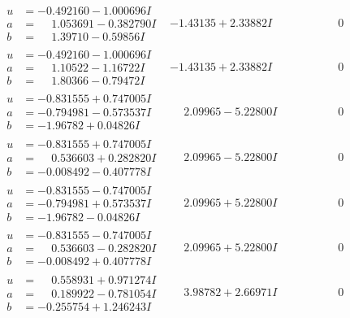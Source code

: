 \documentclass[1p]{elsarticle_modified}
\theoremstyle{definition}
\begin{document}
$$\begin{array}{c|c|c}
\begin{aligned}
u &= -0.492160 - 1.000696 I \\
a &= \phantom{-}1.053691 - 0.382790 I \\
b &= \phantom{-}1.39710 - 0.59856 I\end{aligned}
 & -1.43135 + 2.33882 I & \phantom{-0.000000 } 0 \\ \hline\begin{aligned}
u &= -0.492160 - 1.000696 I \\
a &= \phantom{-}1.10522 - 1.16722 I \\
b &= \phantom{-}1.80366 - 0.79472 I\end{aligned}
 & -1.43135 + 2.33882 I & \phantom{-0.000000 } 0 \\ \hline\begin{aligned}
u &= -0.831555 + 0.747005 I \\
a &= -0.794981 - 0.573537 I \\
b &= -1.96782 + 0.04826 I\end{aligned}
 & \phantom{-}2.09965 - 5.22800 I & \phantom{-0.000000 } 0 \\ \hline\begin{aligned}
u &= -0.831555 + 0.747005 I \\
a &= \phantom{-}0.536603 + 0.282820 I \\
b &= -0.008492 - 0.407778 I\end{aligned}
 & \phantom{-}2.09965 - 5.22800 I & \phantom{-0.000000 } 0 \\ \hline\begin{aligned}
u &= -0.831555 - 0.747005 I \\
a &= -0.794981 + 0.573537 I \\
b &= -1.96782 - 0.04826 I\end{aligned}
 & \phantom{-}2.09965 + 5.22800 I & \phantom{-0.000000 } 0 \\ \hline\begin{aligned}
u &= -0.831555 - 0.747005 I \\
a &= \phantom{-}0.536603 - 0.282820 I \\
b &= -0.008492 + 0.407778 I\end{aligned}
 & \phantom{-}2.09965 + 5.22800 I & \phantom{-0.000000 } 0 \\ \hline\begin{aligned}
u &= \phantom{-}0.558931 + 0.971274 I \\
a &= \phantom{-}0.189922 - 0.781054 I \\
b &= -0.255754 + 1.246243 I\end{aligned}
 & \phantom{-}3.98782 + 2.66971 I & \phantom{-0.000000 } 0 \\ \hline\begin{aligned}

\end{aligned}
\end{array}$$
\end{document}
